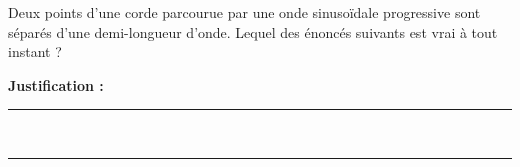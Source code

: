 Deux points d'une corde parcourue par une onde sinusoïdale progressive sont séparés d'une demi-longueur d'onde. Lequel des énoncés suivants est vrai à tout instant ?

\choices

\noindent\textbf{Justification :} \hrulefill \\[2.5ex]
\rule{\linewidth}{0.4pt} \\[2.5ex]
\rule{\linewidth}{0.4pt}
\vfill
